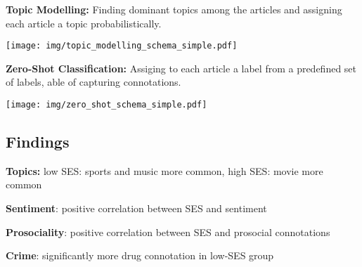     \vspace{0.2cm}
    \begin{minipage}[t]{0.48\textwidth}
        \textbf{Topic Modelling:} Finding dominant topics among the articles and assigning each article a topic probabilistically.
        \begin{center}
            \texttt{[image: img/topic\_modelling\_schema\_simple.pdf]}
        \end{center}
    \end{minipage}
    \hspace{0.04\textwidth}
    \begin{minipage}[t]{0.48\textwidth}
        \textbf{Zero-Shot Classification:} Assiging to each article a label from a predefined set of labels, able of capturing connotations.
        \begin{center}
            \texttt{[image: img/zero\_shot\_schema\_simple.pdf]}
        \end{center}
    \end{minipage}

    \subsection*{Findings}
    \begin{center}
        \begin{minipage}[t]{0.22\textwidth}
            \small{\textbf{Topics:} low SES: sports and music more common, high SES: movie more common}

            \resizebox{!}{\textwidth}{}
        \end{minipage}
        \hspace{0.03\textwidth}
        \begin{minipage}[t]{0.22\textwidth}
            \small{\textbf{Sentiment}: positive correlation between SES and sentiment}

            \resizebox{!}{\textwidth}{}
        \end{minipage}
        \hspace{0.03\textwidth}
        \begin{minipage}[t]{0.22\textwidth}
            \small{\textbf{Prosociality}: positive correlation between SES and prosocial connotations}

            \resizebox{!}{\textwidth}{}
        \end{minipage}
        \hspace{0.03\textwidth}
        \begin{minipage}[t]{0.22\textwidth}
            \small{\textbf{Crime}: significantly more drug connotation in low-SES group}

            \resizebox{!}{\textwidth}{}
        \end{minipage}
    \end{center}

